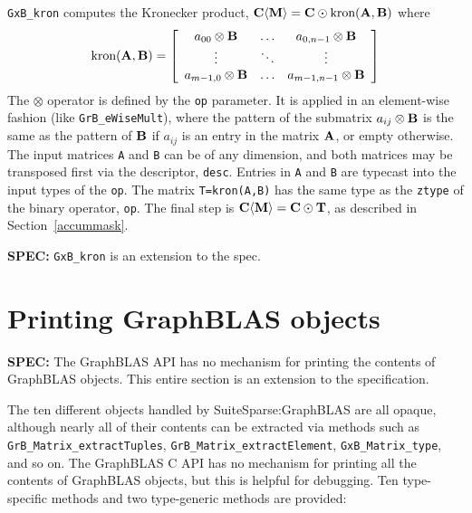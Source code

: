 \documentclass[12pt]{article}
\begin{document}
\verb'GxB_kron' computes the Kronecker product,
${\bf C \langle M \rangle = C \odot \mbox{kron}(A,B)}$ where
\[
\mbox{kron}{\bf (A,B)} =
\left[
    \begin{array}{ccc}
    a_{00} \otimes {\bf B} & \ldots & a_{0,n-1} \otimes {\bf B} \\
    \vdots & \ddots & \vdots \\
    a_{m-1,0} \otimes {\bf B} & \ldots & a_{m-1,n-1} \otimes {\bf B} \\
    \end{array}
\right]
\]
The $\otimes$ operator is defined by the \verb'op' parameter.  It is applied in
an element-wise fashion (like \verb'GrB_eWiseMult'), where the pattern of the
submatrix $a_{ij} \otimes {\bf B}$ is the same as the pattern of ${\bf B}$ if
$a_{ij}$ is an entry in the matrix ${\bf A}$, or empty otherwise.  The input
matrices \verb'A' and \verb'B' can be of any dimension, and both matrices may
be transposed first via the descriptor, \verb'desc'.  Entries in \verb'A' and
\verb'B' are typecast into the input types of the \verb'op'.  The matrix
\verb'T=kron(A,B)' has the same type as the \verb'ztype' of the binary
operator, \verb'op'.  The final step is ${\bf C \langle M \rangle  = C \odot
T}$, as described in Section~\ref{accummask}.

\begin{spec}
{\bf SPEC:} \verb'GxB_kron' is an extension to the spec.
\end{spec}

\newpage
\section{Printing GraphBLAS objects} %
\label{fprint}

\begin{spec}
{\bf SPEC:} The GraphBLAS API has no mechanism for printing the contents of
GraphBLAS objects.  This entire section is an extension to the specification.
\end{spec}

The ten different objects handled by SuiteSparse:GraphBLAS are all opaque,
although nearly all of their contents can be extracted via methods such as
\verb'GrB_Matrix_extractTuples', \verb'GrB_Matrix_extractElement',
\verb'GxB_Matrix_type', and so on.  The GraphBLAS C API has no mechanism for
printing all the contents of GraphBLAS objects, but this is helpful for
debugging.  Ten type-specific methods and two type-generic methods are
provided:
\end{document}
